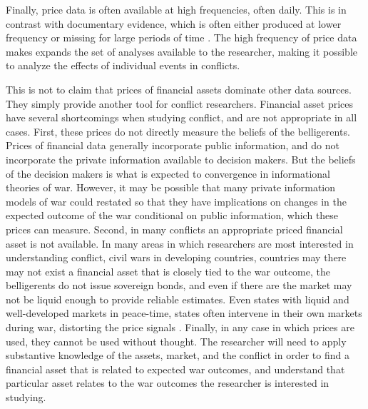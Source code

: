 Finally, price data is often available at high frequencies, often daily.
This is in contrast with documentary evidence, which is often either produced at lower frequency or missing for large periods of time \parencite[][57]{Reiter2009}.
The high frequency of price data makes expands the set of analyses available to the researcher, making it possible to analyze the effects of individual events in conflicts.

This is not to claim that prices of financial assets dominate other data sources.
They simply provide another tool for conflict researchers.
Financial asset prices have several shortcomings when studying conflict, and are not appropriate in all cases.
First, these prices do not directly measure the beliefs of the belligerents.
Prices of financial data generally incorporate public information, and do not incorporate the private information available to decision makers.
But the beliefs of the decision makers is what is expected to convergence in informational theories of war.
However, it may be possible that many private information models of war could restated so that they have implications on changes in the expected outcome of the war conditional on public information, which these prices can measure.
Second, in many conflicts an appropriate priced financial asset is not available.
In many areas in which researchers are most interested in understanding conflict, \eg{} civil wars in developing countries, countries may there may not exist a financial asset  that is closely tied to the war outcome, \eg{} the belligerents do not issue sovereign bonds, and even if there are the market may not be liquid enough to provide reliable estimates.
Even states with liquid and well-developed markets in peace-time, states often intervene in their own markets during war, distorting the price signals \parencite[12]{HaberMitchenerOosterlinckEtAl2015}.
Finally, in any case in which prices are used, they cannot be used without thought.
The researcher will need to apply substantive knowledge of the assets, market, and the conflict in order to find a financial asset that is related to expected war outcomes, and understand that particular asset relates to the war outcomes  the researcher is interested in studying.




